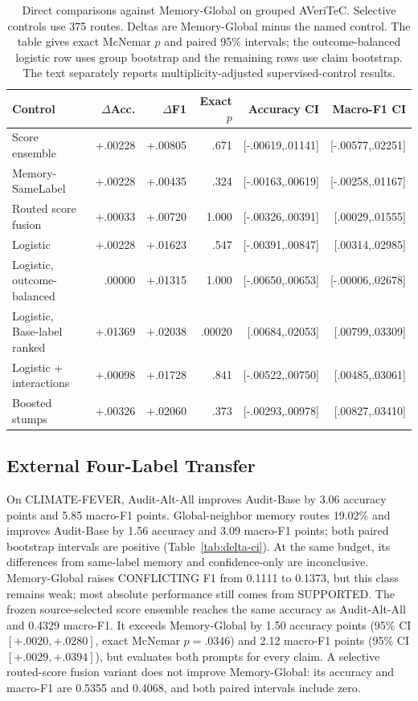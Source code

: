 \documentclass[runningheads]{llncs}
\begin{document}
\begin{table}[t]
\caption{Direct comparisons against Memory-Global on grouped AVeriTeC.
Selective controls use 375 routes. Deltas are Memory-Global minus the named
control. The table gives exact McNemar $p$ and paired 95\% intervals; the
outcome-balanced logistic row uses group bootstrap and the remaining rows use
claim bootstrap. The text separately reports multiplicity-adjusted
supervised-control results.}
\label{tab:stats}
\centering\small
\begin{tabular}{lrrrrr}
\toprule
Control & $\Delta$Acc. & $\Delta$F1 & Exact $p$ & Accuracy CI & Macro-F1 CI \\
\midrule
Score ensemble & +.00228 & +.00805 & .671 & [-.00619,.01141] & [-.00577,.02251] \\
Memory-SameLabel & +.00228 & +.00435 & .324 & [-.00163,.00619] & [-.00258,.01167] \\
Routed score fusion & +.00033 & +.00720 & 1.000 & [-.00326,.00391] & [.00029,.01555] \\
Logistic & +.00228 & +.01623 & .547 & [-.00391,.00847] & [.00314,.02985] \\
Logistic, outcome-balanced & .00000 & +.01315 & 1.000 & [-.00650,.00653] & [-.00006,.02678] \\
Logistic, Base-label ranked & +.01369 & +.02038 & .00020 & [.00684,.02053] & [.00799,.03309] \\
Logistic + interactions & +.00098 & +.01728 & .841 & [-.00522,.00750] & [.00485,.03061] \\
Boosted stumps & +.00326 & +.02060 & .373 & [-.00293,.00978] & [.00827,.03410] \\
\bottomrule
\end{tabular}
\end{table}

\subsection{External Four-Label Transfer}

On CLIMATE-FEVER, Audit-Alt-All improves Audit-Base by 3.06 accuracy points and 5.85 macro-F1
points. Global-neighbor memory routes 19.02\% and improves Audit-Base by 1.56 accuracy and 3.09
macro-F1 points; both paired bootstrap intervals are positive
(Table~\ref{tab:delta-ci}). At the same budget, its differences from same-label memory
and confidence-only are inconclusive. Memory-Global raises CONFLICTING F1 from 0.1111 to
0.1373, but this class remains weak; most absolute performance still comes
from SUPPORTED. The frozen source-selected score ensemble reaches the same
accuracy as Audit-Alt-All and 0.4329 macro-F1. It exceeds Memory-Global by 1.50
accuracy points (95\% CI $[+.0020,+.0280]$, exact McNemar $p=.0346$) and
2.12 macro-F1 points (95\% CI $[+.0029,+.0394]$), but evaluates both prompts
for every claim. A selective routed-score fusion variant does not improve
Memory-Global: its accuracy and macro-F1 are 0.5355 and 0.4068, and both
paired intervals include zero.
\end{document}
